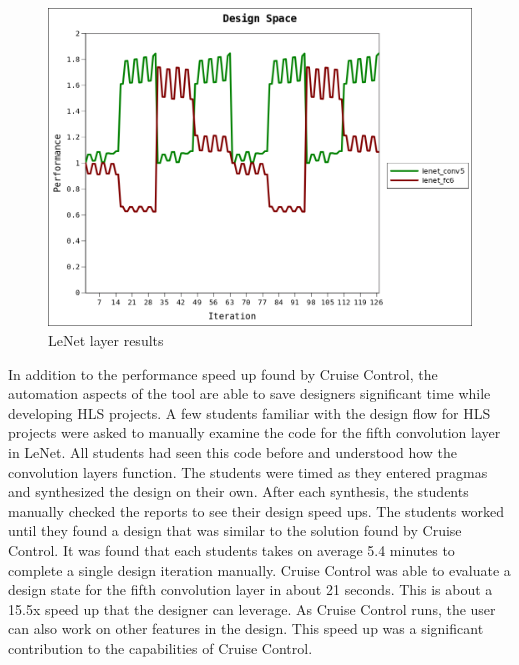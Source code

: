 \documentclass[letterpaper, 10 pt, conference]{IEEEconf}  %
\begin{document}
\begin{figure}[H]
\centering
\includegraphics[scale=.4]{result2.png} 
\caption{LeNet layer results}
\end{figure}


In addition to the performance speed up found by Cruise Control, the automation aspects of the tool are able to save designers significant time while developing HLS projects. A few students familiar with the design flow for HLS projects were asked to manually examine the code for the fifth convolution layer in LeNet. All students had seen this code before and understood how the convolution layers function. The students were timed as they entered pragmas and synthesized the design on their own. After each synthesis, the students manually checked the reports to see their design speed ups. The students worked until they found a design that was similar to the solution found by Cruise Control. It was found that each students takes on average 5.4 minutes to complete a single design iteration manually. Cruise Control was able to evaluate a design state for the fifth convolution layer in about 21 seconds. This is about a 15.5x speed up that the designer can leverage. As Cruise Control runs, the user can also work on other features in the design. This speed up was a significant contribution to the capabilities of Cruise Control. 
\end{document}

